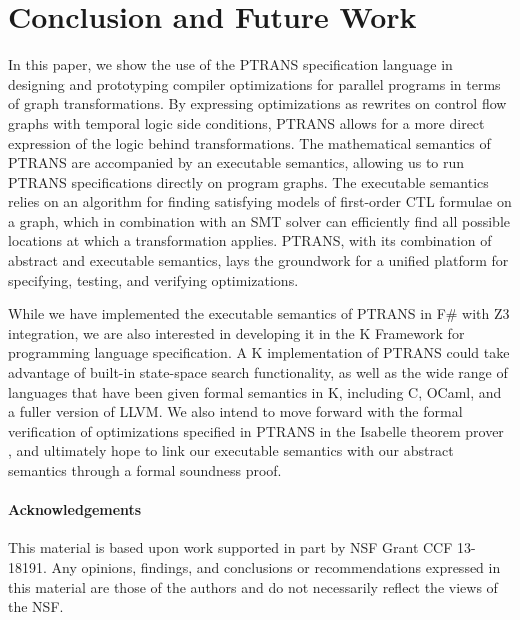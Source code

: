 \documentclass{eptcs}
\newcommand{\ptrans}[0]{PTRANS}
\begin{document}
\section{Conclusion and Future Work}
In this paper, we show the use of the {\ptrans} specification language in designing and prototyping compiler optimizations for parallel programs in terms of graph transformations. By expressing optimizations as rewrites on control flow graphs with temporal logic side conditions, {\ptrans} allows for a more direct expression of the logic behind transformations. The mathematical semantics of {\ptrans} are accompanied by an executable semantics, allowing us to run {\ptrans} specifications directly on program graphs. The executable semantics relies on an algorithm for finding satisfying models of first-order CTL formulae on a graph, which in combination with an SMT solver can efficiently find all possible locations at which a transformation applies. {\ptrans}, with its combination of abstract and executable semantics, lays the groundwork for a unified platform for specifying, testing, and verifying optimizations. 

While we have implemented the executable semantics of {\ptrans} in F\# with Z3 integration, we are also interested in developing it in the K Framework \cite{koverview} for programming language specification. A K implementation of {\ptrans} could take advantage of built-in state-space search functionality, as well as the wide range of languages that have been given formal semantics in K, including C, OCaml, and a fuller version of LLVM. We also intend to move forward with the formal verification of optimizations specified in {\ptrans} in the Isabelle theorem prover \cite{isabelle}, and ultimately hope to link our executable semantics with our abstract semantics through a formal soundness proof.

\paragraph{Acknowledgements}
\sloppy
This material is based upon work supported in part by NSF Grant CCF 13-18191. Any opinions, findings, and conclusions or recommendations expressed in this material are those of the authors and do not necessarily reflect the views of the NSF.
\fussy


\end{document}
